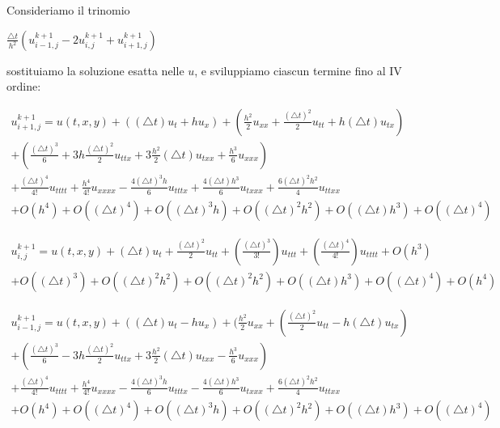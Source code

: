 \documentclass[]{article}
\begin{document}
Consideriamo il trinomio
\begin{center}
	$\frac{\bigtriangleup t}{h^2} (u^{k+1}_{i-1,j} -2u^{k+1}_{i,j} + u^{k+1}_{i+1,j})$
\end{center}
sostituiamo la soluzione esatta nelle $u$, e sviluppiamo ciascun termine fino al IV ordine:

\begin{equation}
\begin{split}
u^{k+1}_{i+1,j} = u(t,x,y) + ((\bigtriangleup t) u_t + h u_x) + (\frac{h^2}{2} u_{xx} + \frac{(\bigtriangleup t)^2}{2} u_{tt} + h (\bigtriangleup t) u_{tx})\\ + (\frac{(\bigtriangleup t)^3}{6} + 3h \frac{(\bigtriangleup t)^2}{2} u_{ttx}  + 3\frac{h^2}{2} (\bigtriangleup t) u_{txx} + \frac{h^3}{6} u_{xxx})\\ + \frac{(\bigtriangleup t)^4}{4!} u_{tttt} + \frac{h^4}{4!} u_{xxxx} - \frac{4 (\bigtriangleup t)^3 h}{6} u_{tttx} + \frac{4 (\bigtriangleup t) h^3}{6} u_{txxx} + \frac{6 (\bigtriangleup t)^2 h^2}{4} u_{ttxx}\\ + O(h^4) + O((\bigtriangleup t)^4) + O((\bigtriangleup t)^3 h) + O((\bigtriangleup t)^2 h^2) + O((\bigtriangleup t) h^3) + O((\bigtriangleup t)^4)
\end{split}
\end{equation}

\begin{equation}
\begin{split}
u^{k+1}_{i,j} = u(t,x,y) + (\bigtriangleup t) u_t + \frac{(\bigtriangleup t)^2}{2} u_{tt} + (\frac{(\bigtriangleup t)^3}{3!}) u_{ttt} + (\frac{(\bigtriangleup t)^4}{4!}) u_{tttt} + O(h^3)\\ + O((\bigtriangleup t)^3) + O((\bigtriangleup t)^2 h^2) + O((\bigtriangleup t)^2 h^2) + O((\bigtriangleup t) h^3) + O((\bigtriangleup t)^4) + O(h^4)
\end{split}
\end{equation}

\begin{equation}
\begin{split}
u^{k+1}_{i-1,j} = u(t,x,y) + ((\bigtriangleup t) u_t - h u_x) + (\frac{h^2}{2} u_{xx} + (\frac{(\bigtriangleup t)^2}{2} u_{tt} - h (\bigtriangleup t) u_{tx}) \\+ (\frac{(\bigtriangleup t)^3}{6} - 3h \frac{(\bigtriangleup t)^2}{2} u_{ttx}  + 3\frac{h^2}{2} (\bigtriangleup t) u_{txx} - \frac{h^3}{6} u_{xxx})\\ + \frac{(\bigtriangleup t)^4}{4!} u_{tttt} + \frac{h^4}{4!} u_{xxxx} - \frac{4 (\bigtriangleup t)^3 h}{6} u_{tttx} - \frac{4 (\bigtriangleup t) h^3}{6} u_{txxx} + \frac{6 (\bigtriangleup t)^2 h^2}{4} u_{ttxx}\\ + O(h^4) + O((\bigtriangleup t)^4) + O((\bigtriangleup t)^3 h) + O((\bigtriangleup t)^2 h^2) + O((\bigtriangleup t) h^3) + O((\bigtriangleup t)^4)
\end{split}
\end{equation}
\end{document}
